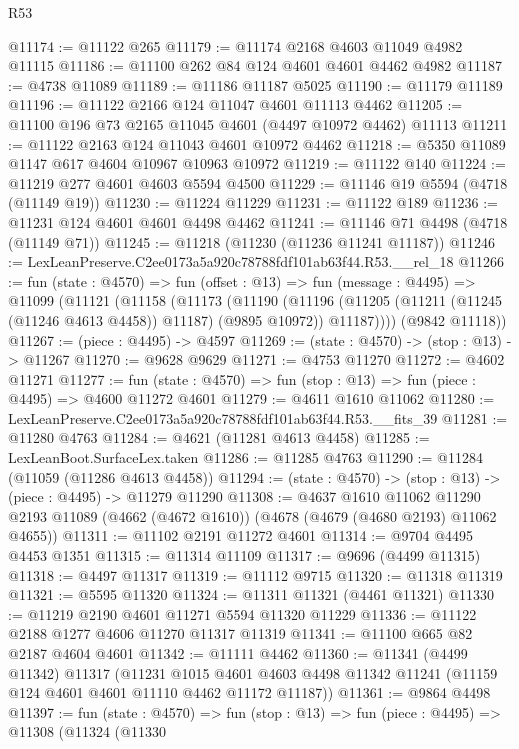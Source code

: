 \begin{lexlean}{R53}
\begin{coremodule}
@11174 := @11122 @265
@11179 := @11174 @2168 @4603 @11049 @4982 @11115
@11186 := @11100 @262 @84 @124 @4601 @4601 @4462 @4982
@11187 := @4738 @11089
@11189 := @11186 @11187 @5025
@11190 := @11179 @11189
@11196 := @11122 @2166 @124 @11047 @4601 @11113 @4462
@11205 := @11100 @196 @73 @2165 @11045 @4601 (@4497 @10972 @4462) @11113
@11211 := @11122 @2163 @124 @11043 @4601 @10972 @4462
@11218 := @5350 @11089 @1147 @617 @4604 @10967 @10963 @10972
@11219 := @11122 @140
@11224 := @11219 @277 @4601 @4603 @5594 @4500
@11229 := @11146 @19 @5594 (@4718 (@11149 @19))
@11230 := @11224 @11229
@11231 := @11122 @189
@11236 := @11231 @124 @4601 @4601 @4498 @4462
@11241 := @11146 @71 @4498 (@4718 (@11149 @71))
@11245 := @11218 (@11230 (@11236 @11241 @11187))
@11246 := LexLeanPreserve.C2ee0173a5a920c78788fdf101ab63f44.R53.__rel_18
@11266 := fun (state : @4570) =>
  fun (offset : @13) =>
  fun (message : @4495) =>
  @11099
    (@11121
      (@11158
        (@11173
          (@11190
            (@11196 (@11205 (@11211 (@11245 (@11246 @4613 @4458)) @11187) (@9895 @10972)) @11187))))
      (@9842 @11118))
@11267 := (piece : @4495) -> @4597
@11269 := (state : @4570) -> (stop : @13) -> @11267
@11270 := @9628 @9629
@11271 := @4753 @11270
@11272 := @4602 @11271
@11277 := fun (state : @4570) => fun (stop : @13) => fun (piece : @4495) => @4600 @11272 @4601
@11279 := @4611 @1610 @11062
@11280 := LexLeanPreserve.C2ee0173a5a920c78788fdf101ab63f44.R53.__fits_39
@11281 := @11280 @4763
@11284 := @4621 (@11281 @4613 @4458)
@11285 := LexLeanBoot.SurfaceLex.taken
@11286 := @11285 @4763
@11290 := @11284 (@11059 (@11286 @4613 @4458))
@11294 := (state : @4570) -> (stop : @13) -> (piece : @4495) -> @11279 @11290
@11308 := @4637
    @1610
    @11062
    @11290
    @2193
    @11089
    (@4662 (@4672 @1610))
    (@4678 (@4679 (@4680 @2193) @11062 @4655))
@11311 := @11102 @2191 @11272 @4601
@11314 := @9704 @4495 @4453 @1351
@11315 := @11314 @11109
@11317 := @9696 (@4499 @11315)
@11318 := @4497 @11317
@11319 := @11112 @9715
@11320 := @11318 @11319
@11321 := @5595 @11320
@11324 := @11311 @11321 (@4461 @11321)
@11330 := @11219 @2190 @4601 @11271 @5594 @11320 @11229
@11336 := @11122 @2188 @1277 @4606 @11270 @11317 @11319
@11341 := @11100 @665 @82 @2187 @4604 @4601
@11342 := @11111 @4462
@11360 := @11341
    (@4499 @11342)
    @11317
    (@11231
      @1015
      @4601
      @4603
      @4498
      @11342
      @11241
      (@11159 @124 @4601 @4601 @11110 @4462 @11172 @11187))
@11361 := @9864 @4498
@11397 := fun (state : @4570) =>
  fun (stop : @13) =>
  fun (piece : @4495) =>
  @11308
    (@11324
      (@11330

\end{coremodule}
\end{lexlean}
